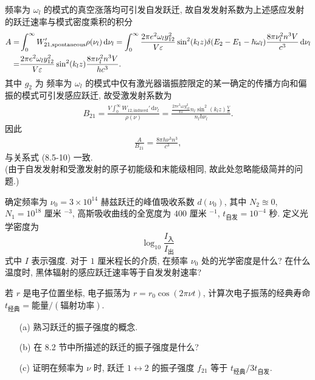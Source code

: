 \documentclass{note}
\begin{document}
\begin{pf}
    频率为 $\omega_l$ 的模式的真空涨落均可引发自发跃迁, 故自发发射系数为上述感应发射的跃迁速率与模式密度乘积的积分
    \begin{align}
        \notag A=&\int_0^{\infty}W_{21,\text{spontaneous}}'\rho(\nu_l)\,\mathrm{d}\nu_l=\int_0^{\infty}\frac{2\pi e^2\omega_ly_{12}^2}{V\varepsilon}\sin^2(k_lz)\delta(E_2-E_1-\hbar\omega_l)\frac{8\pi\nu_l^2n^3V}{c^3}\,\mathrm{d}\nu_l\\
        =&\frac{2\pi e^2\omega_ly_{12}^2}{V\varepsilon}\sin^2(k_lz)\frac{8\pi\nu_l^2n^3V}{hc^3}.
    \end{align}
    其中 $g_2$ 为
    频率为 $\omega_l$ 的模式中仅有激光器谐振腔限定的某一确定的传播方向和偏振的模式可引发感应跃迁, 故受激发射系数为
    \begin{align}
        B_{21}=\frac{V\int_0^{\infty}W_{12,\text{induced}}'\,\mathrm{d}\nu_l}{\rho(\nu)}=\frac{\frac{2\pi e^2\omega_ly_{12}^2}{V\varepsilon}n_l\sin^2(k_lz)\frac{V}{h}}{n_lh\nu_l}.
    \end{align}
    因此
    \begin{align}
        \frac{A}{B_{21}}=\frac{8\pi h\nu^3n^3}{c^3},
    \end{align}
    与关系式 (8.5-10) 一致.\\
    (由于自发发射和受激发射的原子初能级和末能级相同, 故此处忽略能级简并的问题.)
\end{pf}

\begin{exe}
    确定频率为 $\nu_0=3\times 10^{14}$ 赫兹跃迁的峰值吸收系数 $d(\nu_0)$, 其中 $N_2\approxeq 0$, $N_1=10^{18}$ 厘米 ${}^{-3}$, 高斯吸收曲线的全宽度为 $400$ 厘米 ${}^{-1}$, $t_{\text{自发}}=10^{-4}$ 秒. 定义光学密度为
    \[
        \log_{10}\frac{I_{\text{入}}}{I_{\text{出}}}
    \]
    式中 $I$ 表示强度. 对于 $1$ 厘米程长的介质, 在频率 $\nu_0$ 处的光学密度是什么? 在什么温度时, 黑体辐射的感应跃迁速率等于自发发射速率?
\end{exe}
\begin{sol}

\end{sol}

\begin{exe}
    若 $r$ 是电子位置坐标, 电子振荡为 $r=r_0\cos(2\pi\nu t)$, 计算次电子振荡的经典寿命 $t_{\text{经典}}=\text{能量}/(\text{辐射功率})$.
\end{exe}
\begin{sol}
    
\end{sol}

\begin{exe}
    \begin{itemize}
        \item[(a)] 熟习跃迁的振子强度的概念.
        \item[(b)] 在 8.2 节中所描述的跃迁的振子强度是什么?
        \item[(c)] 证明在频率为 $\nu$ 时, 跃迁 $1\leftrightarrow 2$ 的振子强度 $f_{21}$ 等于 $t_{\text{经典}}/3t_{\text{自发}}$.
    \end{itemize}
\end{exe}
\begin{sol}
    
\end{sol}
\end{document}
